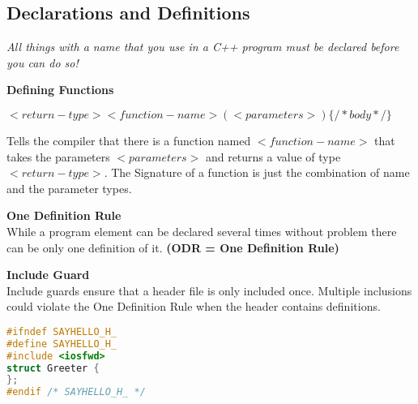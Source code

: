 \subsection{Declarations and Definitions}
\textit{All things with a name that you use in a C++ program must be declared before you can do so!}

\textbf{Defining Functions}
\begin{center}
$<return-type> <function-name> (<parameters>) \{ /* body */ \}$
\end{center}
 Tells the compiler that there is a function named $<function-name>$ that takes the parameters $<parameters>$ and returns a value of type $<return-type>$. The Signature of a function is just the combination of name and the parameter types. 
 
\textbf{One Definition Rule}\\ 
 While a program element can be declared several times without problem there can be only one definition of it. \textbf{(ODR = One Definition Rule)}
 
\textbf{Include Guard}\\
Include guards ensure that a header file is only included once. Multiple inclusions could violate the One Definition Rule when the header contains definitions.
\begin{lstlisting}[language=c++]
#ifndef SAYHELLO_H_
#define SAYHELLO_H_
#include <iosfwd>
struct Greeter {
};
#endif /* SAYHELLO_H_ */ 
\end{lstlisting}

\pagebreak